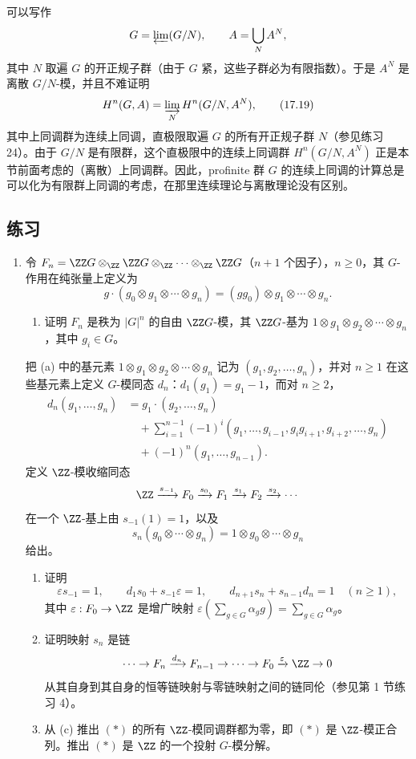 可以写作
\[
  G=\varprojlim (G/N),
  \qquad
  A=\bigcup_N A^N,
\]
其中 $N$ 取遍 $G$ 的开正规子群（由于 $G$ 紧，这些子群必为有限指数）。于是 $A^N$ 是离散 $G/N$-模，并且不难证明
\[
  H^n(G,A)=\varinjlim_N H^n(G/N,A^N),
  \tag{17.19}
\]
其中上同调群为连续上同调，直极限取遍 $G$ 的所有开正规子群 $N$（参见练习 24）。由于 $G/N$ 是有限群，这个直极限中的连续上同调群 $H^n(G/N,A^N)$ 正是本节前面考虑的（离散）上同调群。因此，profinite 群 $G$ 的连续上同调的计算总是可以化为有限群上同调的考虑，在那里连续理论与离散理论没有区别。

\subsection*{练习}

\begin{enumerate}[label=\arabic*.]
  \item 令 $F_n=\ZZ G\otimes_{\ZZ}\ZZ G\otimes_{\ZZ}\cdots\otimes_{\ZZ}\ZZ G$（$n+1$ 个因子），$n\geq0$，其 $G$-作用在纯张量上定义为
  \[
    g\cdot(g_0\otimes g_1\otimes\cdots\otimes g_n)=(gg_0)\otimes g_1\otimes\cdots\otimes g_n.
  \]
  \begin{enumerate}[label=(\alph*)]
    \item 证明 $F_n$ 是秩为 $|G|^n$ 的自由 $\ZZ G$-模，其 $\ZZ G$-基为 $1\otimes g_1\otimes g_2\otimes\cdots\otimes g_n$，其中 $g_i\in G$。
  \end{enumerate}
  把 (a) 中的基元素 $1\otimes g_1\otimes g_2\otimes\cdots\otimes g_n$ 记为 $(g_1,g_2,
  \ldots,g_n)$，并对 $n\geq1$ 在这些基元素上定义 $G$-模同态 $d_n$：$d_1(g_1)=g_1-1$，而对 $n\geq2$，
  \[
  \begin{aligned}
  d_n(g_1,\ldots,g_n)&=g_1\cdot(g_2,\ldots,g_n)\\
  &\quad+\sum_{i=1}^{n-1}(-1)^i(g_1,\ldots,g_{i-1},g_ig_{i+1},g_{i+2},\ldots,g_n)\\
  &\quad+(-1)^n(g_1,\ldots,g_{n-1}).
  \end{aligned}
  \]
  定义 $\ZZ$-模收缩同态
  \[
    \ZZ\xrightarrow{s_{-1}}F_0\xrightarrow{s_0}F_1\xrightarrow{s_1}F_2\xrightarrow{s_2}\cdots
  \]
  在一个 $\ZZ$-基上由 $s_{-1}(1)=1$，以及
  \[
    s_n(g_0\otimes\cdots\otimes g_n)=1\otimes g_0\otimes\cdots\otimes g_n
  \]
  给出。
  \begin{enumerate}[label=(\alph*),resume]
    \item 证明
    \[
      \varepsilon s_{-1}=1,
      \qquad d_1s_0+s_{-1}\varepsilon=1,
      \qquad d_{n+1}s_n+s_{n-1}d_n=1\quad(n\geq1),
    \]
    其中 $\varepsilon:F_0\to\ZZ$ 是增广映射 $\varepsilon(\sum_{g\in G}\alpha_gg)=\sum_{g\in G}\alpha_g$。
    \item 证明映射 $s_n$ 是链
    \[
      \cdots\to F_n\xrightarrow{d_n}F_{n-1}\to\cdots\to F_0\xrightarrow{\varepsilon}\ZZ\to0
    \]
    从其自身到其自身的恒等链映射与零链映射之间的链同伦（参见第 1 节练习 4）。
    \item 从 (c) 推出 $(*)$ 的所有 $\ZZ$-模同调群都为零，即 $(*)$ 是 $\ZZ$-模正合列。推出 $(*)$ 是 $\ZZ$ 的一个投射 $G$-模分解。
  \end{enumerate}


\end{enumerate}
